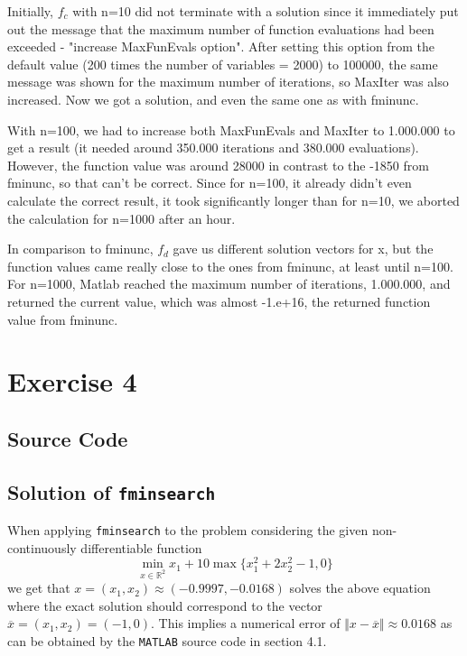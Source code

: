 \documentclass{article}
\begin{document}
    Initially, $f_c$ with n=10 did not terminate with a solution since it immediately put out the message that the maximum number of function evaluations had been exceeded - "increase MaxFunEvals option". After setting this option from the default value (200 times the number of variables = 2000) to 100000, the same message was shown for the maximum number of iterations, so MaxIter was also increased. Now we got a solution, and even the same one as with fminunc.

    With n=100, we had to increase both MaxFunEvals and MaxIter to 1.000.000 to get a result (it needed around 350.000 iterations and 380.000 evaluations). However, the function value was around 28000 in contrast to the -1850 from fminunc, so that can't be correct. Since for n=100, it already didn't even calculate the correct result, it took significantly longer than for n=10, we aborted the calculation for n=1000 after an hour.

    In comparison to fminunc, $f_d$ gave us different solution vectors for x, but the function values came really close to the ones from fminunc, at least until n=100. For n=1000, Matlab reached the maximum number of iterations, 1.000.000, and returned the current value, which was almost -1.e+16, the returned function value from fminunc.
	
	\section{Exercise 4}
	\subsection{Source Code}
	
	
	\subsection{Solution of \texttt{fminsearch}}
	When applying \texttt{fminsearch} to the problem considering the given non-continuously differentiable function 
	\begin{equation*}
		\min_{x\in\mathbb{R}^2}x_1+10\max\{x_1^2+2x_2^2-1,0\}
	\end{equation*}
	we get that $x=(x_1,x_2)\approx(-0.9997,-0.0168)$ solves the above equation where the exact solution should correspond to the vector $\overline{x}=(x_1,x_2)=(-1,0)$. This implies a numerical error of $\Vert x - \overline{x}\Vert \approx 0.0168$ as can be obtained by the \texttt{MATLAB} source code in section 4.1.
\end{document}
